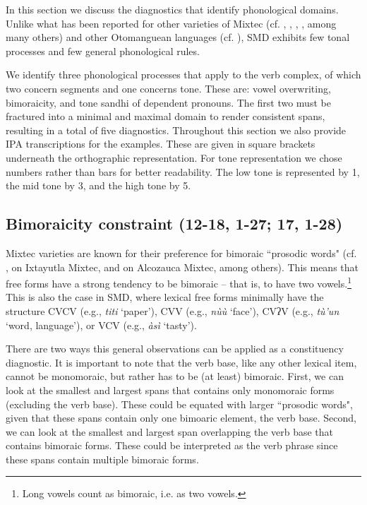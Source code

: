 \documentclass[output=paper]{langscibook}
\begin{document}
In this section we discuss the diagnostics that identify phonological domains.
Unlike what has been reported for other varieties of Mixtec (cf. \citealt{hunter1969phonology}, \citealt{daly1973tone}, \citealt{macaulay1996grammar}, \citealt{hollenbach2003historical}, among many others) and other Otomanguean languages (cf. ), SMD exhibits few tonal processes and few general phonological rules.

We identify three phonological processes that apply to the verb complex, of which two concern segments and one concerns tone. These are: vowel overwriting, bimoraicity, and tone sandhi of dependent pronouns. The first two must be fractured into a minimal and maximal domain to render consistent spans, resulting in a total of five diagnostics. 
Throughout this section we also provide IPA transcriptions for the examples. These are given in square brackets underneath the orthographic representation. For tone representation we chose numbers rather than bars for better readability. The low tone is represented by 1, the mid tone by 3, and the high tone by 5.


\subsection{Bimoraicity constraint (12-18, 1-27; 17, 1-28)}
\label{sub:bimoraity}

Mixtec varieties are known for their preference for bimoraic ``prosodic words" (cf.  \citealt{pike1948tonemic}, \citealt{penner2019prosodic} on Ixtayutla Mixtec, and 
 \citealt{uchihara2021minimality} on Alcozauca Mixtec, among others). 
This means that free forms have a strong tendency to be bimoraic -- that is, to have two vowels.\footnote{Long vowels count as bimoraic, i.e. as two vowels.}
This is also the case in SMD, where lexical free forms minimally have the structure CVCV (e.g., \textit{titi} `paper'), CVV (e.g., \textit{nùù} `face'), CVʔV (e.g., \textit{tù'un} `word, language'), or VCV (e.g., \textit{àsì} `tasty').


There are two ways this general observations can be applied as a constituency diagnostic. It is important to note that the verb base, like any other lexical item, cannot be monomoraic, but rather has to be (at least) bimoraic.
First, we can look at the smallest and largest spans that contains only monomoraic forms (excluding the verb base). These could be equated with larger ``prosodic words", given that these spans contain only one bimoaric element, the verb base.
Second, we can look at the smallest and largest span overlapping the verb base that contains bimoraic forms. These could be interpreted as the verb phrase since these spans contain multiple bimoraic forms.
\end{document}
